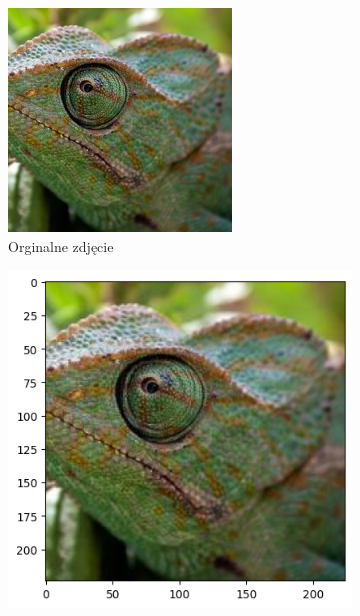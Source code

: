 \begin{figure}[h]
	\centering
	\begin{subfigure}[b]{0.3\textwidth}
		\includegraphics[width=.9\textwidth]{img/examples/appendix/n01694178_23707}
		\caption{Orginalne zdjęcie}  \label{}
	\end{subfigure}
	\begin{subfigure}[b]{0.3\textwidth}
		\centering\includegraphics[width=.9\textwidth]{img/examples/appendix/n01694178_23707_gradcam}

\end{subfigure}
\end{figure}
